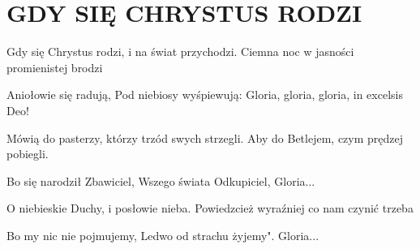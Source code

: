 \documentclass[../../../songbook.tex]{subfiles}
\begin{document}
\TabPositions{8cm} %
\section*{GDY SIĘ CHRYSTUS RODZI}
{}
\vspace{0.5cm}
Gdy się Chrystus rodzi, 	   \newline	 
i na świat przychodzi.  	 \newline	 
Ciemna noc w jasności 	 \newline	 
promienistej brodzi  	 \newline	 
              
\-\hspace{1cm} Aniołowie się radują,  		    \newline	 
\-\hspace{1cm} Pod niebiosy wyśpiewują: 	 \newline	 
\-\hspace{1cm} Gloria, gloria, gloria, 		 \newline	 
\-\hspace{1cm} in excelsis Deo!  			  \newline	 

Mówią do pasterzy,  				 \newline
którzy trzód swych strzegli. 			 \newline
Aby do Betlejem,  		 		 \newline
czym prędzej pobiegli. 	 			 \newline

\-\hspace{1cm} Bo się narodził Zbawiciel,   		 \newline
\-\hspace{1cm} Wszego świata Odkupiciel,   		 \newline
\-\hspace{1cm} Gloria...     						 \newline

O niebieskie Duchy,  		 \newline
i posłowie nieba.    		 \newline
Powiedzcież wyraźniej  		 \newline
co nam czynić trzeba		 \newline

\-\hspace{1cm} Bo my nic nie pojmujemy, 		 \newline
\-\hspace{1cm} Ledwo od strachu żyjemy". 		 \newline
\-\hspace{1cm} Gloria... 		 \newline
\end{document}
